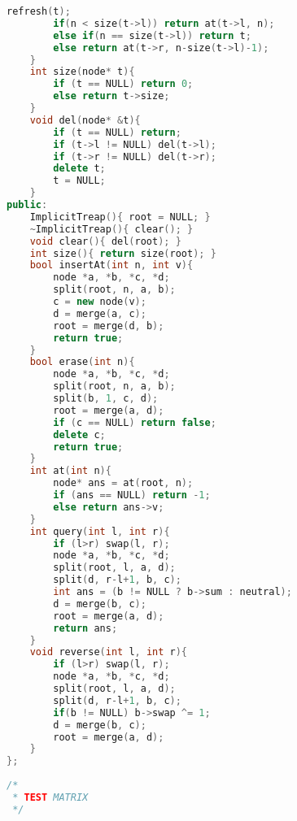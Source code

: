 \documentclass[12pt,a4paper,twoside]{report}
\begin{document}
\begin{lstlisting}[caption=Implicit Treap,language=C++]
        refresh(t);
        if(n < size(t->l)) return at(t->l, n);
        else if(n == size(t->l)) return t;
        else return at(t->r, n-size(t->l)-1);
    }
    int size(node* t){
        if (t == NULL) return 0;
        else return t->size;
    }
    void del(node* &t){
        if (t == NULL) return;
        if (t->l != NULL) del(t->l);
        if (t->r != NULL) del(t->r);
        delete t;
        t = NULL;
    }
public:
    ImplicitTreap(){ root = NULL; }
    ~ImplicitTreap(){ clear(); }
    void clear(){ del(root); }
    int size(){ return size(root); }
    bool insertAt(int n, int v){
        node *a, *b, *c, *d;
        split(root, n, a, b);
        c = new node(v);
        d = merge(a, c);
        root = merge(d, b);
        return true;
    }
    bool erase(int n){
        node *a, *b, *c, *d;
        split(root, n, a, b);
        split(b, 1, c, d);
        root = merge(a, d);
        if (c == NULL) return false;
        delete c;
        return true;
    }
    int at(int n){
        node* ans = at(root, n);
        if (ans == NULL) return -1;
        else return ans->v;
    }
    int query(int l, int r){
        if (l>r) swap(l, r);
        node *a, *b, *c, *d;
        split(root, l, a, d);
        split(d, r-l+1, b, c);
        int ans = (b != NULL ? b->sum : neutral);
        d = merge(b, c);
        root = merge(a, d);
        return ans;
    }
    void reverse(int l, int r){
        if (l>r) swap(l, r);
        node *a, *b, *c, *d;
        split(root, l, a, d);
        split(d, r-l+1, b, c);
        if(b != NULL) b->swap ^= 1;
        d = merge(b, c);
        root = merge(a, d);
    }
};
 
/*
 * TEST MATRIX
 */
 

\end{lstlisting}
\end{document}
